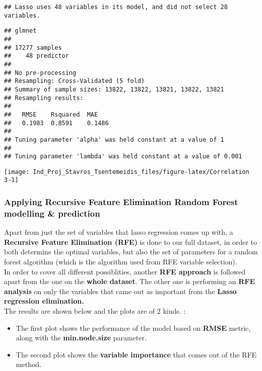 \documentclass[]{article}
\providecommand{\tightlist}{%
  \setlength{\itemsep}{0pt}\setlength{\parskip}{0pt}}
\begin{document}
\begin{verbatim}
## Lasso uses 48 variables in its model, and did not select 28 variables.
\end{verbatim}

\begin{verbatim}
## glmnet 
## 
## 17277 samples
##    48 predictor
## 
## No pre-processing
## Resampling: Cross-Validated (5 fold) 
## Summary of sample sizes: 13822, 13822, 13821, 13822, 13821 
## Resampling results:
## 
##   RMSE    Rsquared  MAE   
##   0.1983  0.8591    0.1486
## 
## Tuning parameter 'alpha' was held constant at a value of 1
## 
## Tuning parameter 'lambda' was held constant at a value of 0.001
\end{verbatim}

\begin{center}\texttt{[image: Ind\_Proj\_Stavros\_Tsentemeidis\_files/figure-latex/Correlation 3-1]} \end{center}

\hypertarget{applying-recursive-feature-elimination-random-forest-modelling-prediction}{%
\subsubsection{Applying Recursive Feature Elimination \textbar{} Random
Forest modelling \&
prediction}\label{applying-recursive-feature-elimination-random-forest-modelling-prediction}}

Apart from just the set of variables that lasso regression comes up
with, a \textbf{Recursive Feature Elimination (RFE)} is done to our full
dataset, in order to both determine the optimal variables, but also the
set of parameters for a random forest algorithm (which is the algorithm
used from RFE variable selection).\\
In order to cover all different possiblities, another \textbf{RFE
approach} is followed apart from the one on the \textbf{whole dataset}.
The other one is performing an \textbf{RFE analysis} on only the
variables that came out as important from the \textbf{Lasso regression
elimination.}\\
The results are shown below and the plots are of 2 kinds. :

\begin{itemize}
\tightlist
\item
  The first plot shows the performance of the model based on
  \textbf{RMSE} metric, along with the \textbf{min.node.size}
  parameter.\\
\item
  The second plot shows the \textbf{variable importance} that comes out
  of the RFE method.
\end{itemize}
\end{document}
